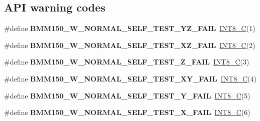\subsection*{A\+PI warning codes}
\begin{DoxyCompactItemize}
\item 
\mbox{\label{group___b_m_m150_ga94a6319fda586fe44e57b3c636c73bad}} 
\#define {\bfseries B\+M\+M150\+\_\+\+W\+\_\+\+N\+O\+R\+M\+A\+L\+\_\+\+S\+E\+L\+F\+\_\+\+T\+E\+S\+T\+\_\+\+Y\+Z\+\_\+\+F\+A\+IL}~\hyperlink{group___b_m_m150_ga1eaa7db37089dcdfb60227725c9c1585}{I\+N\+T8\+\_\+C}(1)
\item 
\mbox{\label{group___b_m_m150_ga04a430294261593fc994ecb3dd89b8dd}} 
\#define {\bfseries B\+M\+M150\+\_\+\+W\+\_\+\+N\+O\+R\+M\+A\+L\+\_\+\+S\+E\+L\+F\+\_\+\+T\+E\+S\+T\+\_\+\+X\+Z\+\_\+\+F\+A\+IL}~\hyperlink{group___b_m_m150_ga1eaa7db37089dcdfb60227725c9c1585}{I\+N\+T8\+\_\+C}(2)
\item 
\mbox{\label{group___b_m_m150_ga80f345c728c74ab2bfcbb524d20cdc52}} 
\#define {\bfseries B\+M\+M150\+\_\+\+W\+\_\+\+N\+O\+R\+M\+A\+L\+\_\+\+S\+E\+L\+F\+\_\+\+T\+E\+S\+T\+\_\+\+Z\+\_\+\+F\+A\+IL}~\hyperlink{group___b_m_m150_ga1eaa7db37089dcdfb60227725c9c1585}{I\+N\+T8\+\_\+C}(3)
\item 
\mbox{\label{group___b_m_m150_gae80db964b313a18fd830f0ba981f1b84}} 
\#define {\bfseries B\+M\+M150\+\_\+\+W\+\_\+\+N\+O\+R\+M\+A\+L\+\_\+\+S\+E\+L\+F\+\_\+\+T\+E\+S\+T\+\_\+\+X\+Y\+\_\+\+F\+A\+IL}~\hyperlink{group___b_m_m150_ga1eaa7db37089dcdfb60227725c9c1585}{I\+N\+T8\+\_\+C}(4)
\item 
\mbox{\label{group___b_m_m150_ga2c30d87bf583772b372b6022102c42c8}} 
\#define {\bfseries B\+M\+M150\+\_\+\+W\+\_\+\+N\+O\+R\+M\+A\+L\+\_\+\+S\+E\+L\+F\+\_\+\+T\+E\+S\+T\+\_\+\+Y\+\_\+\+F\+A\+IL}~\hyperlink{group___b_m_m150_ga1eaa7db37089dcdfb60227725c9c1585}{I\+N\+T8\+\_\+C}(5)
\item 
\mbox{\label{group___b_m_m150_ga03302a1dd8a9a0860853db609facb02a}} 
\#define {\bfseries B\+M\+M150\+\_\+\+W\+\_\+\+N\+O\+R\+M\+A\+L\+\_\+\+S\+E\+L\+F\+\_\+\+T\+E\+S\+T\+\_\+\+X\+\_\+\+F\+A\+IL}~\hyperlink{group___b_m_m150_ga1eaa7db37089dcdfb60227725c9c1585}{I\+N\+T8\+\_\+C}(6)

\end{DoxyCompactItemize}
